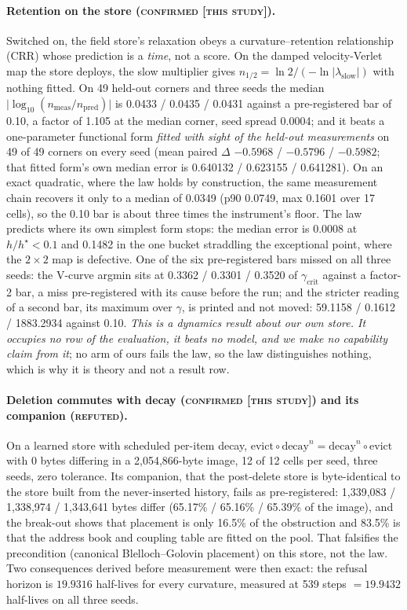 \documentclass{article}
\begin{document}
\paragraph{Retention on the store (\textsc{confirmed [this study]}).} Switched on, the field
store's relaxation obeys a curvature--retention relationship (CRR) whose prediction is a
\emph{time}, not a score. On the damped velocity-Verlet map the store deploys, the slow
multiplier gives $n_{1/2}=\ln2/(-\ln\lvert\lambda_{\text{slow}}\rvert)$ with nothing fitted. On 49
held-out corners and three seeds the median $\lvert\log_{10}(n_{\text{meas}}/n_{\text{pred}})\rvert$ is
0.0433 / 0.0435 / 0.0431 against a pre-registered bar of 0.10, a factor of 1.105 at the median
corner, seed spread 0.0004; and it beats a one-parameter functional form \emph{fitted with sight
of the held-out measurements} on 49 of 49 corners on every seed (mean paired $\Delta$ $-0.5968$ /
$-0.5796$ / $-0.5982$; that fitted form's own median error is 0.640132 / 0.623155 / 0.641281).
On an exact quadratic, where the law holds by construction, the same measurement chain recovers it
only to a median of 0.0349 (p90 0.0749, max 0.1601 over 17 cells), so the 0.10 bar is about three
times the instrument's floor.
The law predicts where its own simplest form stops: the median error is 0.0008 at $h/h^\star<0.1$
and 0.1482 in the one bucket straddling the exceptional point, where the $2\times2$ map is
defective.
One of the six pre-registered bars missed on all three seeds: the V-curve argmin sits at 0.3362 /
0.3301 / 0.3520 of $\gamma_{\text{crit}}$ against a factor-2 bar, a miss pre-registered with its
cause before the run; and the stricter reading of a second bar, its maximum over $\gamma$, is
printed and not moved: 59.1158 / 0.1612 / 1883.2934 against 0.10.
\emph{This is a dynamics result about our own store. It occupies no row of the evaluation, it
beats no model, and we make no capability claim from it}; no arm of ours fails the law, so the law
distinguishes nothing, which is why it is theory and not a result row.

\paragraph{Deletion commutes with decay (\textsc{confirmed [this study]}) and its companion
(\textsc{refuted}).} On a learned store with scheduled per-item decay,
$\text{evict}\circ\text{decay}^n=\text{decay}^n\circ\text{evict}$ with 0 bytes differing in a
2,054,866-byte image, 12 of 12 cells per seed, three seeds, zero tolerance.
Its companion, that the post-delete store is byte-identical to the store built from the
never-inserted history, fails as pre-registered: 1,339,083 / 1,338,974 / 1,343,641 bytes differ
(65.17\% / 65.16\% / 65.39\% of the image), and the break-out shows that placement is only 16.5\%
of the obstruction and 83.5\% is that the address book and coupling table are fitted on the pool.
That falsifies the precondition (canonical Blelloch--Golovin placement) on this store, not the
law. Two consequences derived before measurement were then exact: the refusal horizon is $19.9316$
half-lives for every curvature, measured at 539 steps $=19.9432$ half-lives on all three seeds.
\end{document}
